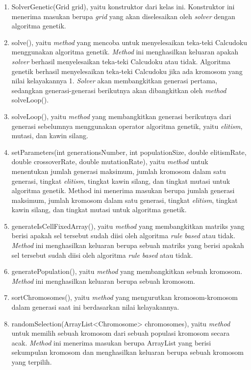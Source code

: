 \begin{enumerate}
\item SolverGenetic(Grid grid), yaitu konstruktor dari kelas ini. Konstruktor ini menerima masukan berupa \textit{grid} yang akan diselesaikan oleh \textit{solver} dengan algoritma genetik.
\item solve(), yaitu \textit{method} yang mencoba untuk menyelesaikan teka-teki Calcudoku menggunakan algoritma genetik. \textit{Method} ini menghasilkan keluaran apakah \textit{solver} berhasil menyelesaikan teka-teki Calcudoku atau tidak. Algoritma genetik berhasil menyelesaikan teka-teki Calcudoku jika ada kromosom yang nilai kelayakannya 1. \textit{Solver} akan membangkitkan generasi pertama, sedangkan generasi-generasi berikutnya akan dibangkitkan oleh \textit{method} solveLoop().
\item solveLoop(), yaitu \textit{method} yang membangkitkan generasi berikutnya dari generasi sebelumnya menggunakan operator algoritma genetik, yaitu \textit{elitism}, mutasi, dan kawin silang.
\item setParameters(int generationsNumber, int populationSize, double elitismRate, double crossoverRate, double mutationRate), yaitu \textit{method} untuk menentukan jumlah generasi maksimum, jumlah kromosom dalam satu generasi, tingkat \textit{elitism}, tingkat kawin silang, dan tingkat mutasi untuk algoritma genetik. Method ini menerima masukan berupa jumlah generasi maksimum, jumlah kromosom dalam satu generasi, tingkat \textit{elitism}, tingkat kawin silang, dan tingkat mutasi untuk algoritma genetik.
\item generateIsCellFixedArray(), yaitu \textit{method} yang membangkitkan matriks yang berisi apakah sel tersebut sudah diisi oleh algoritma \textit{rule based} atau tidak. \textit{Method} ini menghasilkan keluaran berupa sebuah matriks yang berisi apakah sel tersebut sudah diisi oleh algoritma \textit{rule based} atau tidak.
\item generatePopulation(), yaitu \textit{method} yang membangkitkan sebuah kromosom. \textit{Method} ini menghasilkan keluaran berupa sebuah kromosom.
\item sortChromosomes(), yaitu \textit{method} yang mengurutkan kromosom-kromosom dalam generasi saat ini berdasarkan nilai kelayakannya.
\item randomSelection(ArrayList<Chromosome> chromosomes), yaitu \textit{method} untuk memilih sebuah kromosom dari sebuah populasi kromosom secara acak. \textit{Method} ini menerima masukan berupa ArrayList yang berisi sekumpulan kromosom dan menghasilkan keluaran berupa sebuah kromosom yang terpilih.

\end{enumerate}
